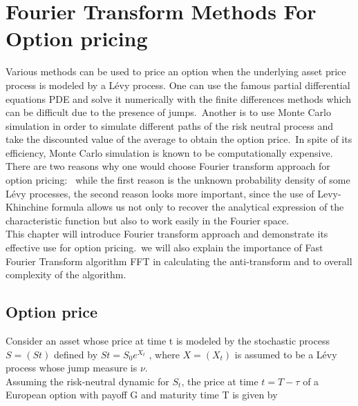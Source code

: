 \documentclass[12pt]{report}
\begin{document}
\chapter{Fourier Transform Methods For Option pricing }

Various methods can be used to price an option when the underlying
asset price process is modeled by a Lévy process. One can use the famous partial differential equations PDE  and solve it numerically with the finite differences methods which  can be difficult due to the presence of jumps.~Another  is to use Monte Carlo simulation in order to simulate different paths of the risk neutral process and take the discounted value of the average  to obtain the option price.~In spite of its efficiency, Monte Carlo simulation is known to be computationally expensive. \\

There are two reasons why one would choose Fourier transform approach for option pricing:~ 
while the first reason is the unknown probability density of some Lévy processes, the second reason looks more important, since the use of Levy-Khinchine formula allows us not only to recover the analytical expression of the characteristic function but also to work easily in the Fourier space. \\

This chapter will introduce Fourier transform approach and demonstrate its effective use for option pricing.~we will also explain the importance of Fast Fourier Transform algorithm FFT in calculating the anti-transform and   to overall complexity of the algorithm. 
\newpage
\section{Option price}
Consider an asset whose price at time t is modeled by the stochastic process $S = (St)$
defined by $St = S_0 e^{X_t}$ , where $X = (X_t)$  is assumed to be a Lévy process whose
jump measure is $\nu$.\\
Assuming the risk-neutral dynamic for $S_t$, the price at time $t = T-\tau$  of a European option with payoff G and maturity time T is given by
\end{document}
